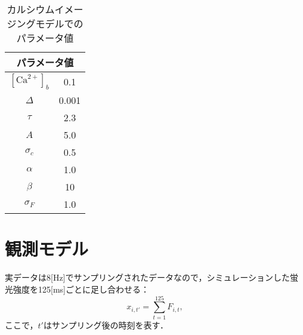 \begin{table}[htb]
  \center
  \begin{tabular}{c|c}
		\multicolumn{2}{c}{パラメータ値} \\ \hline
		$[\text{Ca}^{2+}]_b$ & 0.1\\
		$\Delta$ & 0.001\\
		$\tau$ & 2.3\\
		$A$ & 5.0\\
		$\sigma_c$ & 0.5 \\
		$\alpha$ & 1.0\\
		$\beta$ & 10\\
		$\sigma_F$ & 1.0\\ \hline
  \end{tabular}
  \caption{カルシウムイメージングモデルでのパラメータ値}
  \label{tab:parameter2}
\end{table}

\section{観測モデル}
実データは8[Hz]でサンプリングされたデータなので，シミュレーションした蛍光強度を125[ms]ごとに足し合わせる：
\begin{equation}
  x_{i,t'} = \sum_{t=1}^{125} F_{i,t},
  \label{eq:observation}
\end{equation}
ここで，$t'$はサンプリング後の時刻を表す．
